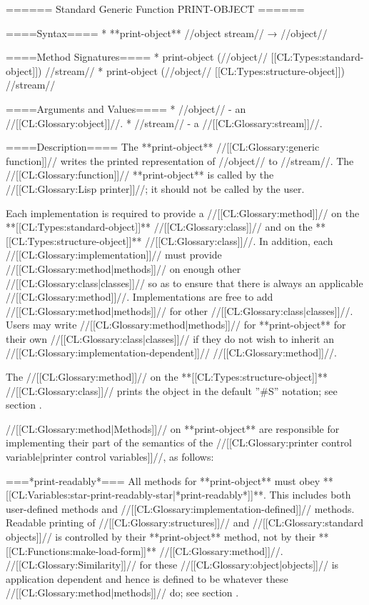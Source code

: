 ====== Standard Generic Function PRINT-OBJECT ======

====Syntax====
  * **print-object** //object stream// → //object//

====Method Signatures====
  * print-object (//object// [[CL:Types:standard-object]]) //stream//
  * print-object (//object// [[CL:Types:structure-object]]) //stream//

====Arguments and Values====
  * //object// - an //[[CL:Glossary:object]]//.
  * //stream// - a //[[CL:Glossary:stream]]//.

====Description====
The **print-object** //[[CL:Glossary:generic function]]// writes the printed representation of //object// to //stream//. The //[[CL:Glossary:function]]// **print-object** is called by the //[[CL:Glossary:Lisp printer]]//; it should not be called by the user.

Each implementation is required to provide a //[[CL:Glossary:method]]// on the **[[CL:Types:standard-object]]** //[[CL:Glossary:class]]// and on the **[[CL:Types:structure-object]]** //[[CL:Glossary:class]]//. In addition, each //[[CL:Glossary:implementation]]// must provide //[[CL:Glossary:method|methods]]// on enough other //[[CL:Glossary:class|classes]]// so as to ensure that there is always an applicable //[[CL:Glossary:method]]//. Implementations are free to add //[[CL:Glossary:method|methods]]// for other //[[CL:Glossary:class|classes]]//. Users may write //[[CL:Glossary:method|methods]]// for **print-object** for their own //[[CL:Glossary:class|classes]]// if they do not wish to inherit an //[[CL:Glossary:implementation-dependent]]// //[[CL:Glossary:method]]//.

The //[[CL:Glossary:method]]// on the **[[CL:Types:structure-object]]** //[[CL:Glossary:class]]// prints the object in the default ''#S'' notation; see section {\secref\PrintingStructures}.

//[[CL:Glossary:method|Methods]]// on **print-object** are responsible for implementing their part of the semantics of the //[[CL:Glossary:printer control variable|printer control variables]]//, as follows:

===*print-readably*===
All methods for **print-object** must obey **[[CL:Variables:star-print-readably-star|*print-readably*]]**. This includes both user-defined methods and //[[CL:Glossary:implementation-defined]]// methods. Readable printing of //[[CL:Glossary:structures]]// and //[[CL:Glossary:standard objects]]// is controlled by their **print-object** method, not by their **[[CL:Functions:make-load-form]]** //[[CL:Glossary:method]]//. //[[CL:Glossary:Similarity]]// for these //[[CL:Glossary:object|objects]]// is application dependent and hence is defined to be whatever these //[[CL:Glossary:method|methods]]// do; see section {\secref\Similarity}.

